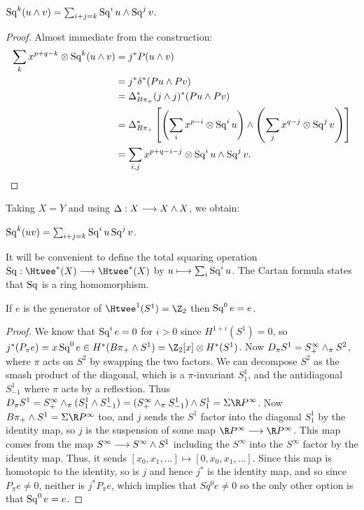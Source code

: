 \begin{cor}
$\operatorname{Sq}^k(u \wedge v) = \sum_{i+j = k} \operatorname{Sq}^i u \wedge \operatorname{Sq}^j v$.
\end{cor}
%
\begin{proof}
Almost immediate from the construction:
\begin{align*}
\sum_k x^{p+q-k} \otimes \Sq^k(u \sprod v) & = j^* P(u \sprod v) \\
& = j^* \delta^*(Pu \sprod Pv) \\
& = \Delta_{B \pi_+}^* (j \sprod j)^*(Pu \sprod Pv) \\
& = \Delta_{B \pi_+}^*\left[\left(\sum_i x^{p-i} \otimes \Sq^i u\right) \sprod \left(\sum_j x^{q-j} \otimes \Sq^j v\right)\right] \\ %
& = \sum_{i, j}x^{p+q-i-j} \otimes \Sq^i u \sprod \Sq^j v.\qedhere
\end{align*}
\end{proof}
\noindent
Taking $X = Y$ and using $\Delta: X \longrightarrow X \wedge X$, we obtain:
\begin{cor}
$\operatorname{Sq}^k(uv) = \sum_{i+j=k} \operatorname{Sq}^i u \operatorname{Sq}^j v$.
\end{cor}
\noindent It will be convenient to define the total squaring operation $\Sq:\Htwee^*(X)\to\Htwee^*(X)$ by $ u\longmapsto\sum_i \operatorname{Sq}^i u$. The Cartan formula states that $\operatorname{Sq}$ is a ring homomorphism.

\begin{lem}
If $e$ is the generator of $\Htwee^1 (S^1) = \Z_2$ then $\operatorname{Sq}^0 e = e$.
\end{lem}

\begin{proof}
We know that $\operatorname{Sq}^i e = 0$ for $i>0$ since $H^{1+i}(S^1)=0$, so $j^*(P_{\pi}e)=x\Sq^0 e \in H^*(B\pi_+ \sprod S^1)=\Z_2[x]\otimes H^*(S^1)$.  Now $D_{\pi}S^1 = S^{\infty}_+\wedge_{\pi} S^2$, where $\pi$ acts on $S^2$ by swapping the two factors.  We can decompose $S^2$ as the smash product of the diagonal, which is a $\pi$-invariant $S^1_1$, and the antidiagonal $S^1_{-1}$ where $\pi$ acts by a reflection.  Thus $D_{\pi} S^1 = S^{\infty}_+ \sprod_\pi (S^1_1 \sprod S^1_{-1}) = (S^{\infty}_+\sprod_{\pi} S^1_{-1}) \sprod S^1_1 = \Sigma \RP^{\infty}$.  Now $B\pi_+\sprod S^1=\Sigma \RP^{\infty}$ too, and $j$ sends the $S^1$ factor into the diagonal $S^1_1$ by the identity map, so $j$ is the suspension of some map $\RP^{\infty}\to\RP^{\infty}$.  This map comes from the map $S^{\infty}\longrightarrow S^{\infty}\wedge S^1$ including the $S^{\infty}$ into the $S^{\infty}$ factor by the identity map.  Thus, it sends $[x_0,x_1,\ldots]\mapsto [0,x_0,x_1,\ldots]$.  Since this map is homotopic to the identity, so is $j$ and hence $j^*$ is the identity map, and so since $P_\pi e\neq 0$, neither is $j^*P_{\pi}e$, which implies that $Sq^0e\neq 0$ so the only other option is that $\operatorname{Sq}^0 e = e$.
\end{proof}

